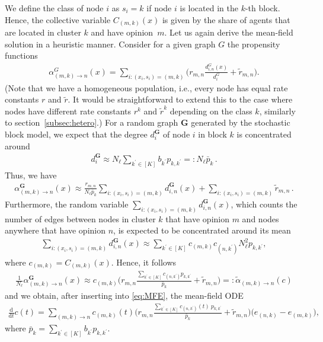 \documentclass[a4paper,
               10pt,
               pdftex,
               normalheadings,
               headsepline,
               footsepline,
               headinclude,
               footinclude,
               DIV=14,
               abstracton]
{scrartcl}
\newcommand{\rv}[1]{\bm{#1}}
\newcommand{\diff}{\mathrm{d}}
\begin{document}
We define the class of node $i$ as $s_i = k$ if node $i$ is located in the $k$-th block.
Hence, the collective variable $C_{(m, k)}(x)$ is given by the share of agents that are located in cluster $k$ and have opinion~$m$.
Let us again derive the mean-field solution in a heuristic manner.
Consider for a given graph $G$ the propensity functions
\begin{align} \label{eq:block_propensity}
    \alpha^{G}_{(m,k)\to n}(x) = \sum_{i: (x_i, s_i) = (m,k)} \Big( r_{m, n}  \frac{d_{i,n}^{G}(x)}{d_{i}^{G}} + \tilde{r}_{m,n} \Big).
\end{align}
(Note that we have a homogeneous population, i.e., every node has equal rate constants $r$ and $\tilde{r}$. It would be straightforward to extend this to the case where nodes have different rate constants $r^k$ and $\tilde{r}^k$ depending on the class $k$, similarly to section~\ref{subsec:hetero}.)
For a random graph $\rv{G}$ generated by the stochastic block model, we expect that the degree $d_i^{\rv{G}}$ of node $i$ in block $k$ is concentrated around
\begin{align}
    d_i^{\rv{G}} \approx N_\ell \sum_{k^\prime \in [K]} b_{k^\prime} p_{k,{k^\prime}} =: N_\ell \bar{p}_k\,.
\end{align}
Thus, we have
\begin{align}
    \alpha^{\rv{G}}_{(m,k)\to n}(x) \approx \frac{r_{m,n}}{N_\ell \bar{p}_k} \sum_{i: (x_i, s_i) = (m,k)} d_{i,n}^{\rv{G}}(x) + \sum_{i: (x_i, s_i) = (m,k)} \tilde{r}_{m, n}\,.
\end{align}
Furthermore, the random variable $\sum_{i: (x_i, s_i) = (m,k)} d_{i,n}^{\rv{G}}(x)$, which counts the number of edges between nodes in cluster $k$ that have opinion $m$ and nodes anywhere that have opinion $n$, is expected to be concentrated around its mean
\begin{align}
    \sum_{i: (x_i, s_i) = (m,k)} d_{i,n}^{\rv{G}}(x) \approx \sum_{{k^\prime} \in [K]} c_{(m,k)} c_{(n,{k^\prime})} N_\ell^2 p_{k, {k^\prime}},
\end{align}
where $c_{(m,k)} = C_{(m,k)}(x)$.
Hence, it follows
\begin{align} 
    \frac{1}{N_\ell} \alpha^{\rv{G}}_{(m,k)\to n}(x) \approx c_{(m,k)}\Big(r_{m, n} \frac{\sum_{{k^\prime} \in [K]} c_{(n,{k^\prime})} p_{k, {k^\prime}}}{\bar{p}_k} + \tilde{r}_{m, n} \Big) =: \tilde{\alpha}_{(m,k)\to n}(c)
    \label{eq:propensity_sbm}
\end{align}
and we obtain, after inserting into \eqref{eq:MFE}, the mean-field ODE
\begin{align} \label{eq:mfe_stochastic_block_model}
    \frac{\diff}{\diff t} c(t) = \sum_{(m,k) \to n} c_{(m,k)}(t)\Big(r_{m, n} \frac{\sum_{{k^\prime} \in [K]} c_{(n,{k^\prime})}(t)\ p_{k, {k^\prime}}}{\bar{p}_k} + \tilde{r}_{m, n} \Big) \big(e_{(n,k)} - e_{(m,k)}\big),
\end{align}
where $\bar{p}_k = \sum_{k^\prime \in [K]} b_{k^\prime} p_{k,{k^\prime}}$.
\end{document}
